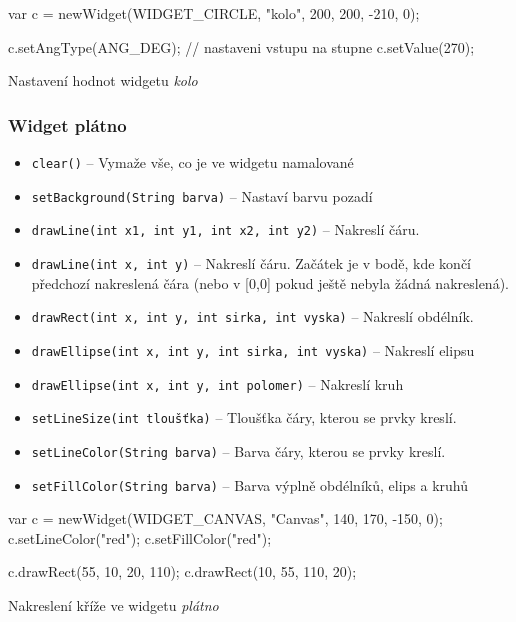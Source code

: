\documentclass[12pt, a4paper, oneside]{article}
\newcommand{\It}{\textit}  %
\begin{document}
\begin{listing}[H]
\begin{jscode}
var c = newWidget(WIDGET_CIRCLE, "kolo", 200, 200, -210, 0);

c.setAngType(ANG_DEG); // nastaveni vstupu na stupne
c.setValue(270);
\end{jscode}
\caption{Nastavení hodnot widgetu \It{kolo}}
\end{listing}

\subsubsection*{Widget plátno}
\begin{itemize}
    \item {\color{blue}\verb/clear()/} -- Vymaže vše, co je ve widgetu namalované
    \item {\color{blue}\verb/setBackground(String barva)/} -- Nastaví barvu pozadí
    \item {\color{blue}\verb/drawLine(int x1, int y1, int x2, int y2)/} -- Nakreslí čáru.
    \item {\color{blue}\verb/drawLine(int x, int y)/} -- Nakreslí čáru. Začátek je v bodě, kde končí předchozí nakreslená čára (nebo v [0,0] pokud ještě nebyla žádná nakreslená).
    \item {\color{blue}\verb/drawRect(int x, int y, int sirka, int vyska)/} -- Nakreslí obdélník.
    \item {\color{blue}\verb/drawEllipse(int x, int y, int sirka, int vyska)/} -- Nakreslí elipsu
    \item {\color{blue}\verb/drawEllipse(int x, int y, int polomer)/} -- Nakreslí kruh
    \item {\color{blue}\verb/setLineSize(int tloušťka)/} -- Tloušťka čáry, kterou se prvky kreslí.
    \item {\color{blue}\verb/setLineColor(String barva)/} -- Barva čáry, kterou se prvky kreslí.
    \item {\color{blue}\verb/setFillColor(String barva)/} -- Barva výplně obdélníků, elips a kruhů
\end{itemize}

\begin{listing}[H]
\begin{jscode}
var c = newWidget(WIDGET_CANVAS, "Canvas", 140, 170, -150, 0);
c.setLineColor("red");
c.setFillColor("red");

c.drawRect(55, 10, 20, 110);
c.drawRect(10, 55, 110, 20);
\end{jscode}
\caption{Nakreslení kříže ve widgetu \It{plátno}}
\end{listing}
\end{document}
